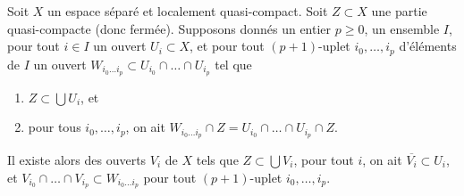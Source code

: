\begin{lemma}
\label{lemma-lift-covering-of-a-closed}
Soit $X$ un espace séparé et localement quasi-compact.
Soit $Z \subset X$ une partie quasi-compacte (donc fermée).
Supposons donnés un entier $p \geq 0$, un ensemble $I$, pour tout $i \in I$
un ouvert $U_i \subset X$, et pour tout $(p + 1)$-uplet
$i_0, \ldots, i_p$ d'éléments de $I$ un ouvert
$W_{i_0 \ldots i_p} \subset U_{i_0} \cap \ldots \cap U_{i_p}$
tel que
\begin{enumerate}
\item $Z \subset \bigcup U_i$, et
\item pour tous $i_0, \ldots, i_p$, on ait
$W_{i_0 \ldots i_p} \cap Z = U_{i_0} \cap \ldots \cap U_{i_p} \cap Z$.
\end{enumerate}
Il existe alors des ouverts $V_i$ de $X$ tels que
$Z \subset \bigcup V_i$,
pour tout $i$, on ait $\overline{V_i} \subset U_i$, et
$V_{i_0} \cap \ldots \cap V_{i_p} \subset W_{i_0 \ldots i_p}$
pour tout $(p + 1)$-uplet $i_0, \ldots, i_p$.
\end{lemma}

